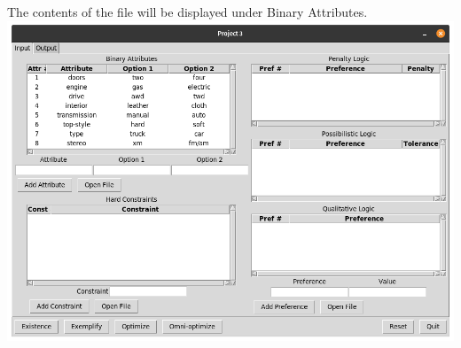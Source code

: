 \documentclass[titlepage]{article}
\begin{document}
The contents of the file will be displayed under Binary Attributes.\\
\includegraphics[scale=0.3]{attributes_imported}
\newpage
\end{document}

